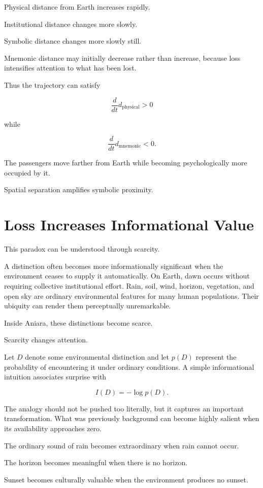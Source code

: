 \documentclass[11pt,oneside]{book}
\theoremstyle{definition}
\theoremstyle{remark}
\begin{document}
Physical distance from Earth increases rapidly.

Institutional distance changes more slowly.

Symbolic distance changes more slowly still.

Mnemonic distance may initially decrease rather than increase, because loss intensifies attention to what has been lost.

Thus the trajectory can satisfy

\[
\frac{d}{dt}d_{\mathrm{physical}}>0
\]

while

\[
\frac{d}{dt}d_{\mathrm{mnemonic}}<0.
\]

The passengers move farther from Earth while becoming psychologically more occupied by it.

Spatial separation amplifies symbolic proximity.

\section{Loss Increases Informational Value}

This paradox can be understood through scarcity.

A distinction often becomes more informationally significant when the environment ceases to supply it automatically. On Earth, dawn occurs without requiring collective institutional effort. Rain, soil, wind, horizon, vegetation, and open sky are ordinary environmental features for many human populations. Their ubiquity can render them perceptually unremarkable.

Inside Aniara, these distinctions become scarce.

Scarcity changes attention.

Let \(D\) denote some environmental distinction and let \(p(D)\) represent the probability of encountering it under ordinary conditions. A simple informational intuition associates surprise with

\[
I(D)=-\log p(D).
\]

The analogy should not be pushed too literally, but it captures an important transformation. What was previously background can become highly salient when its availability approaches zero.

The ordinary sound of rain becomes extraordinary when rain cannot occur.

The horizon becomes meaningful when there is no horizon.

Sunset becomes culturally valuable when the environment produces no sunset.
\end{document}
